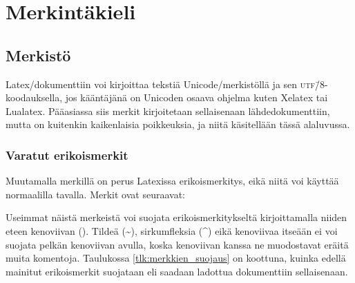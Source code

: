 \chapter{Merkintäkieli}


\section{Merkistö}

Latex\-/dokumenttiin voi kirjoittaa tekstiä Unicode\-/merkistöllä ja sen
\textsc{utf}\=/8\/-koodauksella, jos kääntäjänä on Unicoden osaava
ohjelma kuten Xelatex tai Lualatex. Pääasiassa siis merkit kirjoitetaan
sellaisenaan lähdedokumenttiin, mutta on kuitenkin kaikenlaisia
poikkeuksia, ja niitä käsitellään tässä alaluvussa.

\subsection{Varatut erikoismerkit}

Muutamalla merkillä on perus Latexissa erikoismerkitys, eikä niitä voi
käyttää normaalilla tavalla. Merkit ovat seuraavat:

\begin{koodilohkosis}
\end{koodilohkosis}

Useimmat näistä merkeistä voi suojata erikoismerkitykseltä
kirjoittamalla niiden eteen kenoviivan (\koodi{\keno}). Tildeä
(\textasciitilde), sirkumfleksia (\textasciicircum) eikä kenoviivaa
itseään ei voi suojata pelkän kenoviivan avulla, koska kenoviivan kanssa
ne muodostavat eräitä muita komentoja. Taulukossa
\ref{tlk:merkkien_suojaus} on koottuna, kuinka edellä mainitut
erikoismerkit suojataan eli saadaan ladottua dokumenttiin sellaisenaan.

